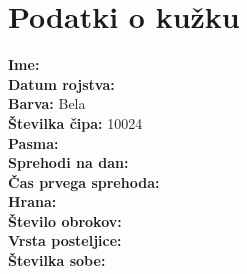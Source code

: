 \documentclass[12pt]{article}
\begin{document}
\section*{Podatki o kužku}

\textbf{Ime:}  \\

\textbf{Datum rojstva:}  \\

\textbf{Barva:} Bela \\

\textbf{Številka čipa:} 10024 \\

\textbf{Pasma:}  \\

\textbf{Sprehodi na dan:}  \\

\textbf{Čas prvega sprehoda:}  \\

\textbf{Hrana:}  \\

\textbf{Število obrokov:}  \\

\textbf{Vrsta posteljice:}  \\

\textbf{Številka sobe:}  \\
\end{document}
